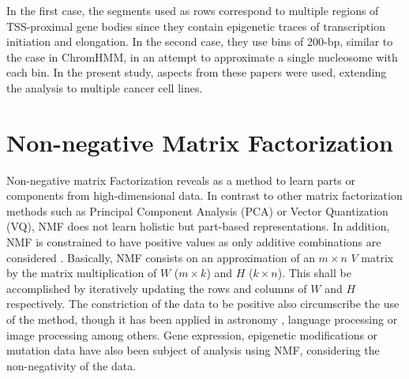 \medskip

In the first case, the segments used as rows correspond to multiple regions of TSS-proximal gene bodies since they contain epigenetic traces of transcription initiation and elongation. In the second case, they use bins of 200-bp, similar to the case in ChromHMM, in an attempt to approximate a single nucleosome with each bin. In the present study, aspects from these papers were used, extending the analysis to multiple cancer cell lines.


\section{Non-negative Matrix Factorization}

Non-negative matrix Factorization reveals as a method to learn parts or components from high-dimensional data. In contrast to other matrix factorization methods such as Principal Component Analysis (PCA) or Vector Quantization (VQ), NMF does not learn holistic but part-based representations. In addition, NMF is constrained to have positive values as only additive combinations are considered \cite{Lee1999}. Basically, NMF consists on an approximation of an $m \times n$ $V$ matrix by the matrix multiplication of $W$ ($m \times k$) and $H$ ($k \times n$). This shall be accomplished by iteratively updating the rows and columns of $W$ and $H$ respectively. The constriction of the data to be positive also circumscribe the use of the method, though it has been applied in astronomy \cite{Ren2017}, language processing \cite{Bertin2010} or image processing \cite{Yang2007} among others. Gene expression, epigenetic modifications or mutation data have also been subject of analysis using NMF, considering the non-negativity of the data.

\medskip

